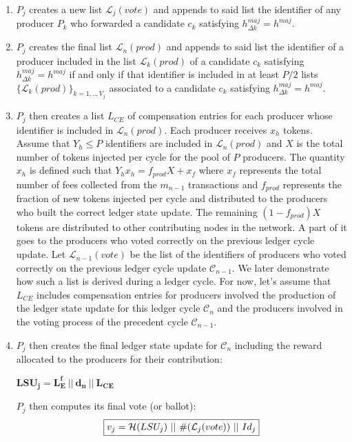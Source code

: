 \begin{enumerate}
\item $P_j$ creates a new list $\mathcal{L}_j(vote)$ and appends to said list the identifier of any producer $P_k$ who forwarded a candidate $c_k$ satisfying $h^{maj}_{\Delta k} = h^{maj}$.
\item $P_j$ creates the final list $\mathcal{L}_n(prod)$ and appends to said list  the identifier of a producer included in the list $\mathcal{L}_k(prod)$ of a candidate $c_k$ satisfying $h^{maj}_{\Delta k} = h^{maj}$ if and only if that identifier is included in at least $P/2$ lists $\{\mathcal{L}_{k}(prod)\}_{k=1,..,V_j}$ associated to a candidate $c_{k}$ satisfying $h^{maj}_{\Delta k} = h^{maj}$. 
\item $P_j$ then creates a list $L_{CE}$ of compensation entries for each producer whose identifier is included in $\mathcal{L}_n(prod)$. Each producer receives $x_h$ tokens. Assume that $Y_h \leq P$ identifiers are included in $\mathcal{L}_n(prod)$ and $X$ is the total number of tokens injected per cycle for the pool of $P$ producers. The quantity $x_h$ is defined such that $Y_hx_h = f_{prod}X + x_f$ where $x_f$ represents the total number of fees collected from the $m_{n-1}$ transactions and $f_{prod}$ represents the fraction of new tokens injected per cycle and distributed to the producers who built the correct ledger state update. The remaining $(1-f_{prod})X$ tokens are distributed to other contributing nodes in the network. A part of it goes to the producers who voted correctly on the previous ledger cycle update. Let $\mathcal{L}_{n-1}(vote)$ be the list of the identifiers of producers who voted correctly on the previous ledger cycle update $\mathcal{C}_{n-1}$. We later demonstrate how such a list is derived during a ledger cycle. For now, let's assume that $L_{CE}$ includes compensation entries for producers involved the production of the ledger state update for this ledger cycle $\mathcal{C}_n$ and the producers involved in the voting process of the precedent cycle $\mathcal{C}_{n-1}$. 
\item $P_j$ then creates the final ledger state update for $\mathcal{C}_n$ including the reward allocated to the producers for their contribution:
\begin{center}
$\mathbf{LSU_j = L^f_E~||~d_n~||~L_{CE}}$
\end{center}
$P_j$ then computes its final vote (or ballot):
\begin{equation}
\label{eq:vj}
\fbox{$v_j = \mathcal{H}(LSU_j)~||~\#(\mathcal{L}_j(vote))~||~Id_j$}
\end{equation}


\end{enumerate}

